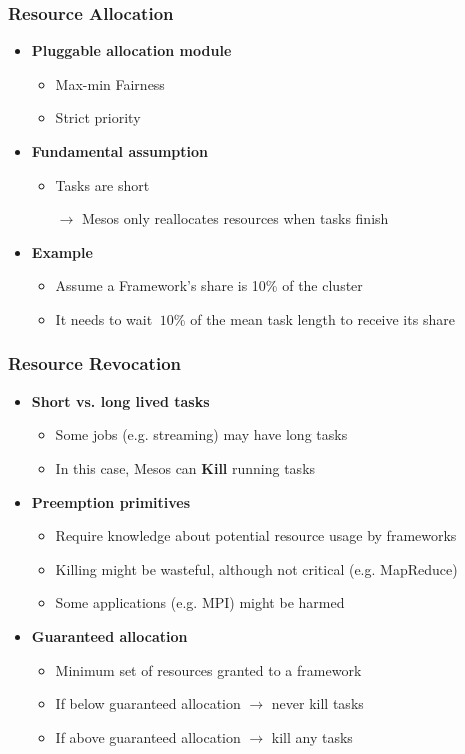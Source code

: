 \begin{frame}
\frametitle{Resource Allocation}
\begin{itemize}
	\item {\bf Pluggable allocation module}
	\begin{itemize}
		\item Max-min Fairness
		\item Strict priority
	\end{itemize}
	\item {\bf Fundamental assumption}
	\begin{itemize}
		\item Tasks are short
		\item[$\to$] Mesos only reallocates resources when tasks finish
	\end{itemize}
	\item {\bf Example}
	\begin{itemize}
		\item Assume a Framework's share is 10\% of the cluster
		\item It needs to wait $~10$\% of the mean task length to receive its share
	\end{itemize}
\end{itemize}
\end{frame}

\begin{frame}
\frametitle{Resource Revocation}
\begin{itemize}
	\item {\bf Short vs. long lived tasks}
	\begin{itemize}
		\item Some jobs (e.g. streaming) may have long tasks
		\item In this case, Mesos can {\bf Kill} running tasks
	\end{itemize}
	\item {\bf Preemption primitives}
	\begin{itemize}
		\item Require knowledge about potential resource usage by frameworks
		\item Killing might be wasteful, although not critical (e.g. MapReduce)
		\item Some applications (e.g. MPI) might be harmed
	\end{itemize}
	\item {\bf Guaranteed allocation}
	\begin{itemize}
		\item Minimum set of resources granted to a framework
		\item If below guaranteed allocation $\to$ never kill tasks
		\item If above guaranteed allocation $\to$ kill any tasks
	\end{itemize}
\end{itemize}
\end{frame}

